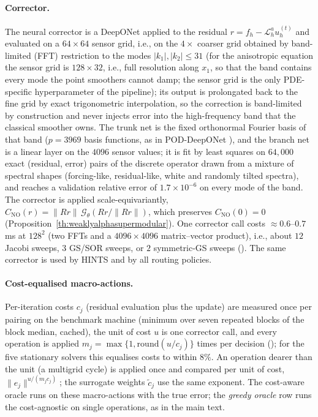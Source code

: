 \paragraph{Corrector.} The neural corrector is a DeepONet applied to the residual $r = f_h - \mathcal{L}_h^a u^{(t)}_h$ and evaluated on a $64\times 64$ sensor grid, i.e., on the $4\times$ coarser grid obtained by band-limited (FFT) restriction to the modes $|k_1|,|k_2| \le 31$ (for the anisotropic equation the sensor grid is $128\times 32$, i.e., full resolution along $x_1$, so that the band contains every mode the point smoothers cannot damp; the sensor grid is the only PDE-specific hyperparameter of the pipeline); its output is prolongated back to the fine grid by exact trigonometric interpolation, so the correction is band-limited by construction and never injects error into the high-frequency band that the classical smoother owns. The trunk net is the fixed orthonormal Fourier basis of that band ($p = 3969$ basis functions, as in POD-DeepONet \citep{lu2022comprehensive}), and the branch net is a linear layer on the $4096$ sensor values; it is fit by least squares on $64{,}000$ exact (residual, error) pairs of the discrete operator drawn from a mixture of spectral shapes (forcing-like, residual-like, white and randomly tilted spectra), and reaches a validation relative error of $1.7\times 10^{-6}$ on every mode of the band. The corrector is applied scale-equivariantly, $C_{\mathrm{NO}}(r) = \|Rr\|\,\mathcal{G}_\theta(Rr/\|Rr\|)$, which preserves $C_{\mathrm{NO}}(0) = 0$ (Proposition~\ref{th:weaklyalphasupermodular}). One corrector call costs $\approx 0.6$--$0.7$\,ms at $128^2$ (two FFTs and a $4096\times 4096$ matrix--vector product), i.e., about $12$ Jacobi sweeps, $3$ GS/SOR sweeps, or $2$ symmetric-GS sweeps (). The same corrector is used by HINTS and by all routing policies.

\paragraph{Cost-equalised macro-actions.} Per-iteration costs $c_j$ (residual evaluation plus the update) are measured once per pairing on the benchmark machine (minimum over seven repeated blocks of the block median, cached), the unit of cost $u$ is one corrector call, and every operation is applied $m_j = \max\{1,\mathrm{round}(u/c_j)\}$ times per decision (); for the five stationary solvers this equalises costs to within $8\%$. An operation dearer than the unit (a multigrid cycle) is applied once and compared per unit of cost, $\|e_j\|^{u/(m_j c_j)}$; the surrogate weights $\tilde c_j$ use the same exponent. The cost-aware oracle runs  on these macro-actions with the true error; the \emph{greedy oracle} row runs the cost-agnostic  on single operations, as in the main text.


